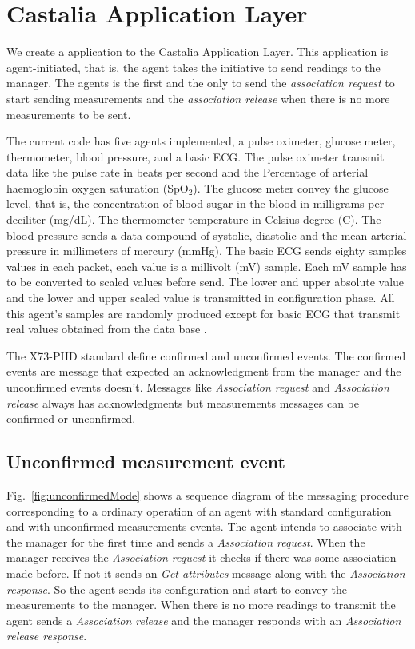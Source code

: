 \section{Castalia Application Layer}\label{castaliaapplayer}

We create a application to the Castalia Application Layer. This application is agent-initiated, that is, the agent takes the initiative to send readings to the manager. The agents is the first and the only to send the \textit{association request} to start sending measurements and the \textit{association release} when there is no more measurements to be sent.

The current code has five agents implemented, a pulse oximeter, glucose meter, thermometer, blood pressure, and a basic ECG. The pulse oximeter transmit data like the pulse rate in beats per second and the Percentage of arterial haemoglobin oxygen saturation (SpO$_2$). The glucose meter convey the glucose level, that is, the concentration of blood sugar in the blood in milligrams per deciliter (mg\//dL). The thermometer temperature in Celsius degree (\textdegree C). The blood pressure sends a data compound of systolic, diastolic and the mean arterial pressure in millimeters of mercury (mmHg). The basic ECG sends eighty samples values in each packet, each value is a millivolt (mV) sample. Each mV sample has to be converted to scaled values before send. The lower and upper absolute value and the lower and upper scaled value is transmitted in configuration phase. All this agent's samples are randomly produced except for basic ECG that transmit real values obtained from the data base \cite{b2}. 

The X73-PHD standard define confirmed and unconfirmed events. The confirmed events are message that expected an acknowledgment from the manager and the unconfirmed events doesn't. Messages like \textit{Association request} and \textit{Association release} always has acknowledgments but measurements messages can be confirmed or unconfirmed. %

\subsection{Unconfirmed measurement event}\label{sec:UnconfirmedMeasurementEvent}

Fig.~\ref{fig:unconfirmedMode} shows a sequence diagram of the messaging procedure corresponding to a ordinary operation of an agent with standard configuration and with unconfirmed measurements events. The agent intends to associate with the manager for the first time and sends a \textit{Association request}. When the manager receives the \textit{Association request} it checks if there was some association made before. If not it sends an \textit{Get attributes} message along with the \textit{Association response}. So the agent sends its configuration and start to convey the measurements to the manager. When there is no more readings to transmit the agent sends a \textit{Association release} and the manager responds with an \textit{Association release response}.


